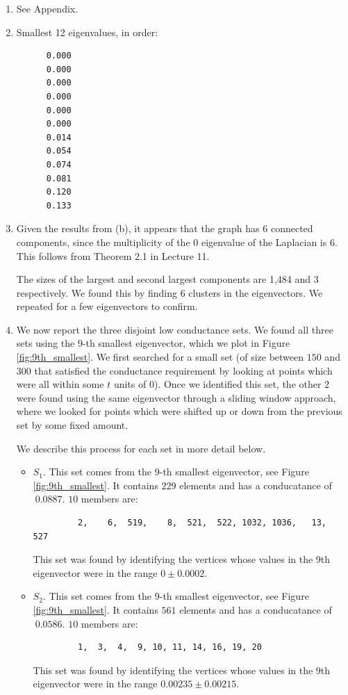 \documentclass[12pt]{article}
\begin{document}
\begin{enumerate}[label=(\alph*)]
  \item See Appendix.
  \item
    Smallest 12 eigenvalues, in order:
    \begin{verbatim}
      0.000
      0.000
      0.000
      0.000
      0.000
      0.000
      0.014
      0.054
      0.074
      0.081
      0.120
      0.133
    \end{verbatim}
  \item
    Given the results from (b), it appears that the graph has 6 connected components, since the multiplicity of the $0$ eigenvalue of the Laplacian is $6$. This follows from Theorem 2.1 in Lecture 11.

    The sizes of the largest and second largest components are 1,484 and 3 respectively. We found this by finding 6 clusters in the eigenvectors. We repeated for a few eigenvectors to confirm.

  \item 
    We now report the three disjoint low conductance sets. We found all three sets using the $9$-th smallest eigenvector, which we plot in Figure \ref{fig:9th_smallest}. We first searched for a small set (of size between $150$ and $300$ that satisfied the conductance requirement by looking at points which were all within some $t$ units of $0$). Once we identified this set, the other $2$ were found using the same eigenvector through a sliding window approach, where we looked for points which were shifted up or down from the previous set by some fixed amount.

    We describe this process for each set in more detail below.

    \begin{itemize}
      \item $S_1$. This set comes from the $9$-th smallest eigenvector, see Figure \ref{fig:9th_smallest}. It contains $229$ elements and has a conducatance of $~0.0887$. $10$ members are:
      \begin{verbatim}
         2,    6,  519,    8,  521,  522, 1032, 1036,   13,  527
      \end{verbatim}
      This set was found by identifying the vertices whose values in the 9th eigenvector were in the range $0 \pm 0.0002$.
      \item $S_2$. This set comes from the $9$-th smallest eigenvector, see Figure \ref{fig:9th_smallest}. It contains $561$ elements and has a conducatance of $~0.0586$. $10$ members are:
      \begin{verbatim}
         1,  3,  4,  9, 10, 11, 14, 16, 19, 20
      \end{verbatim}
      This set was found by identifying the vertices whose values in the 9th eigenvector were in the range $0.00235 \pm 0.00215$.


\end{itemize}
\end{enumerate}
\end{document}
